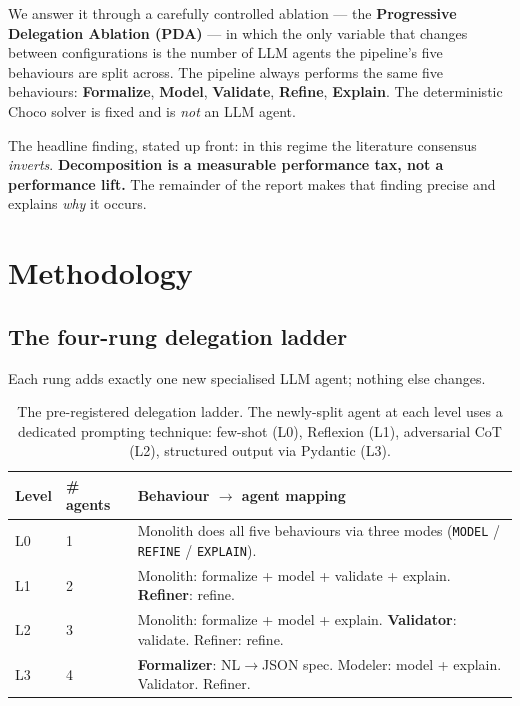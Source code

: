 \documentclass[11pt,a4paper]{article}
\begin{document}
We answer it through a carefully controlled ablation --- the
\textbf{Progressive Delegation Ablation (PDA)} --- in which the only variable
that changes between configurations is the number of LLM agents the pipeline's
five behaviours are split across. The pipeline always performs the same five
behaviours: \textbf{Formalize}, \textbf{Model}, \textbf{Validate},
\textbf{Refine}, \textbf{Explain}. The deterministic Choco solver is fixed
and is \emph{not} an LLM agent.

The headline finding, stated up front: in this regime the literature consensus
\emph{inverts}. \textbf{Decomposition is a measurable performance tax, not a
performance lift.} The remainder of the report makes that finding precise and
explains \emph{why} it occurs.

\section{Methodology}

\subsection{The four-rung delegation ladder}
Each rung adds exactly one new specialised LLM agent; nothing else changes.

\begin{table}[H]
\centering
\small
\begin{tabular}{@{}llp{9.4cm}@{}}
\toprule
Level & \# agents & Behaviour $\to$ agent mapping \\
\midrule
L0 & 1 & Monolith does all five behaviours via three modes
        (\texttt{MODEL} / \texttt{REFINE} / \texttt{EXPLAIN}). \\
L1 & 2 & Monolith: formalize + model + validate + explain.
        \textbf{Refiner}: refine. \\
L2 & 3 & Monolith: formalize + model + explain.
        \textbf{Validator}: validate. Refiner: refine. \\
L3 & 4 & \textbf{Formalizer}: NL$\to$JSON spec.
        Modeler: model + explain. Validator. Refiner. \\
\bottomrule
\end{tabular}
\caption{The pre-registered delegation ladder. The newly-split agent at each
level uses a dedicated prompting technique: few-shot (L0), Reflexion (L1),
adversarial CoT (L2), structured output via Pydantic (L3).}
\end{table}
\end{document}
